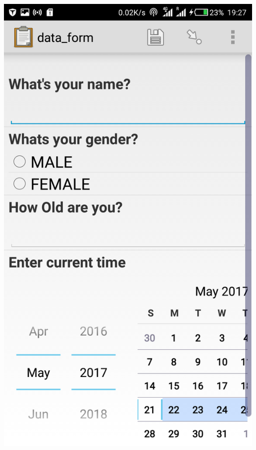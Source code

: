 \documentclass[12pt,letterpaper]{article}
\begin{document}
{			\includegraphics[scale=0.1]{paul1}
}
\end{document}
